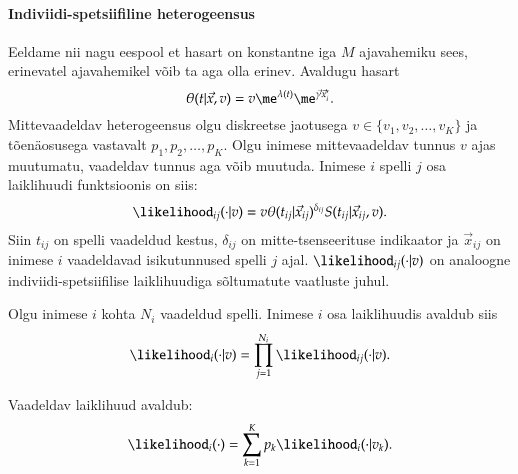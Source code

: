 \documentclass[a4paper]{article}
\numberwithin{equation}{subsection}
\begin{document}
\newpage
\paragraph{Indiviidi-spetsiif{}iline heterogeensus}
Eeldame nii nagu eespool et hasart on konstantne iga $M$ ajavahemiku
sees, erinevatel ajavahemikel võib ta aga olla erinev.  Avaldugu
hasart
\begin{equation}
  \theta(t|\vec{x},v) = v \me^{\lambda(t)} 
  \me^{\vec{\gamma}
\vec{x}_i'}.
\end{equation}
Mittevaadeldav heterogeensus olgu
diskreetse jaotusega $v \in \{v_1, v_2, \ldots, v_K\}$ ja tõenäosusega
vastavalt $p_1, p_2, \ldots, p_K$.  Olgu inimese mittevaadeldav tunnus
$v$ ajas muutumatu, vaadeldav tunnus aga võib muutuda.  Inimese $i$
spelli $j$ osa laiklihuudi funktsioonis on siis:
\begin{equation}
  \likelihood_{ij}(\cdot|v) = v \theta(t_{ij}|\vec{x}_{ij})^{\delta_{ij}} 
  S(t_{ij}|\vec{x}_{ij},v).
\end{equation}
Siin $t_{ij}$ on spelli vaadeldud kestus, $\delta_{ij}$ on
mitte-tsenseerituse indikaator ja $\vec{x}_{ij}$ on inimese $i$
vaadeldavad isikutunnused spelli $j$ ajal.  $\likelihood_{ij}(\cdot|v)$ on
analoogne indiviidi-spetsiifilise laiklihuudiga sõltumatute vaatluste
juhul. 

Olgu inimese $i$ kohta $N_i$ vaadeldud spelli.  Inimese $i$ osa
laiklihuudis avaldub siis
\begin{equation}
  \likelihood_i(\cdot|v) = \prod_{j=1}^{N_i} \likelihood_{ij}(\cdot|v).
\end{equation}

Vaadeldav laiklihuud avaldub:
\begin{equation}
  \likelihood_i(\cdot) = \sum_{k=1}^K p_k \likelihood_i(\cdot|v_k).
\end{equation}
\end{document}
